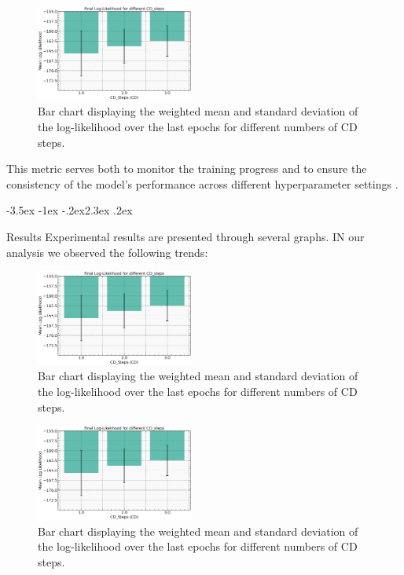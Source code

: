 \documentclass[prl,twocolumn]{revtex4-1}
\makeatletter
\renewcommand{\section}{\@startsection{section}{1}{\z@}%
    {-3.5ex \@plus -1ex \@minus -.2ex}{2.3ex \@plus.2ex}%
    {\normalfont\bfseries\raggedright}}
\makeatother
\begin{document}
\begin{figure}[!tb]
	\includegraphics[width=0.465\textwidth]{final_L_of_CD.png}
	\caption{Bar chart displaying the weighted mean and standard deviation of the log-likelihood over the last epochs for different numbers of CD steps.}
	\label{fig:final_L_of_CD}
\end{figure}

This metric serves both to monitor the training progress and to ensure the consistency of the model's performance across different hyperparameter settings \cite{bortoletto,intro_ML}.

\section{Results}
\label{sec:results}
Experimental results are presented through several graphs. IN our analysis we observed the following trends:

\begin{figure}[!tb]
	\includegraphics[width=0.465\textwidth]{final_L_of_CD.png}
	\caption{Bar chart displaying the weighted mean and standard deviation of the log-likelihood over the last epochs for different numbers of CD steps.}
	\label{fig:final_L_of_CD}
\end{figure}

\begin{figure}[!tb]
	\includegraphics[width=0.465\textwidth]{final_L_of_CD.png}
	\caption{Bar chart displaying the weighted mean and standard deviation of the log-likelihood over the last epochs for different numbers of CD steps.}
	\label{fig:final_L_of_CD}
\end{figure}
\end{document}

